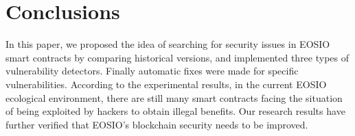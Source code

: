 \documentclass[a4paper, 10pt, conference, twocolumn]{ieeeconf}       %
\begin{document}
\section{Conclusions}

In this paper,
we proposed the idea of searching for security issues in EOSIO smart contracts by comparing historical versions,
and implemented three types of vulnerability detectors.
Finally automatic fixes were made for specific vulnerabilities.
According to the experimental results,
in the current EOSIO ecological environment,
there are still many smart contracts facing the situation of being exploited by hackers to obtain illegal benefits.
Our research results have further verified that EOSIO's blockchain security needs to be improved.

\addtolength{\textheight}{-12cm}   %














\end{document}
